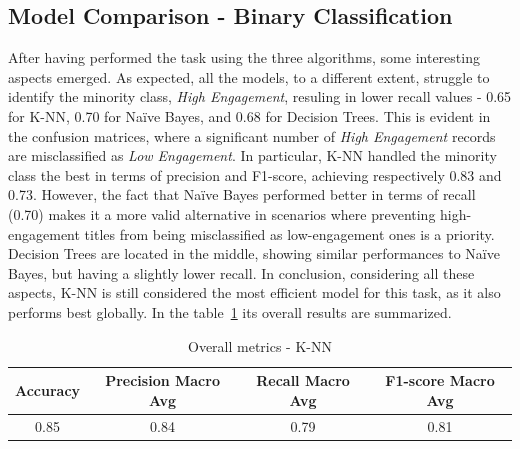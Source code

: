 \subsection{Model Comparison - Binary Classification}
After having performed the task using the three algorithms, some interesting aspects emerged.
As expected, all the models, to a different extent, struggle to identify the minority class, \textit{High Engagement}, resuling in lower recall values
- 0.65 for K-NN, 0.70 for Naïve Bayes, and 0.68 for Decision Trees.
This is evident in the confusion matrices, where a significant number of \textit{High Engagement} records are misclassified as \textit{Low Engagement}.
In particular, K-NN handled the minority class the best in terms of precision and F1-score, achieving respectively 0.83 and 0.73.
However, the fact that Naïve Bayes performed better in terms of recall (0.70) makes it a more valid alternative
in scenarios where preventing high-engagement titles from being misclassified as low-engagement ones is a priority.
Decision Trees are located in the middle, showing similar performances to Naïve Bayes, but having a slightly lower recall.
In conclusion, considering all these aspects, K-NN is still considered the most efficient model for this task, as it also performs best globally. 
In the table~\ref{tab:best_model_binary_classification} its overall results are summarized.
\begin{table}[H]
    \centering
    \begin{tabular}{cccc}
        \toprule
        \bf{Accuracy} & \bf{Precision Macro Avg} & \bf{Recall Macro Avg} & \bf{F1-score Macro Avg} \\
        \midrule
         0.85 & 0.84 & 0.79 & 0.81 \\
        \bottomrule
    \end{tabular}
    \caption{Overall metrics - K-NN}
    \label{tab:best_model_binary_classification}
\end{table}





